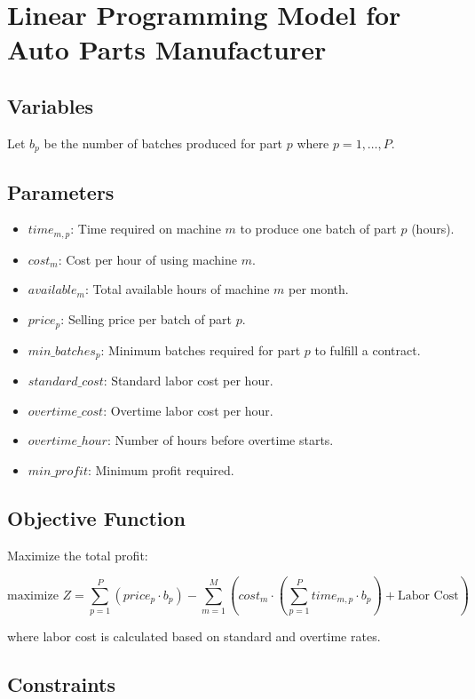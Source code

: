 \documentclass{article}
\begin{document}
\section*{Linear Programming Model for Auto Parts Manufacturer}

\subsection*{Variables}
Let \( b_p \) be the number of batches produced for part \( p \) where \( p = 1, \ldots, P \).

\subsection*{Parameters}
\begin{itemize}
    \item \( time_{m,p} \): Time required on machine \( m \) to produce one batch of part \( p \) (hours).
    \item \( cost_m \): Cost per hour of using machine \( m \).
    \item \( available_m \): Total available hours of machine \( m \) per month.
    \item \( price_p \): Selling price per batch of part \( p \).
    \item \( min\_batches_p \): Minimum batches required for part \( p \) to fulfill a contract.
    \item \( standard\_cost \): Standard labor cost per hour.
    \item \( overtime\_cost \): Overtime labor cost per hour.
    \item \( overtime\_hour \): Number of hours before overtime starts.
    \item \( min\_profit \): Minimum profit required.
\end{itemize}

\subsection*{Objective Function}
Maximize the total profit:

\[
\text{maximize } Z = \sum_{p=1}^{P} (price_p \cdot b_p) - \sum_{m=1}^{M} \left( cost_m \cdot \left( \sum_{p=1}^{P} time_{m,p} \cdot b_p \right) + \text{Labor Cost} \right)
\]

where labor cost is calculated based on standard and overtime rates.

\subsection*{Constraints}
\end{document}
